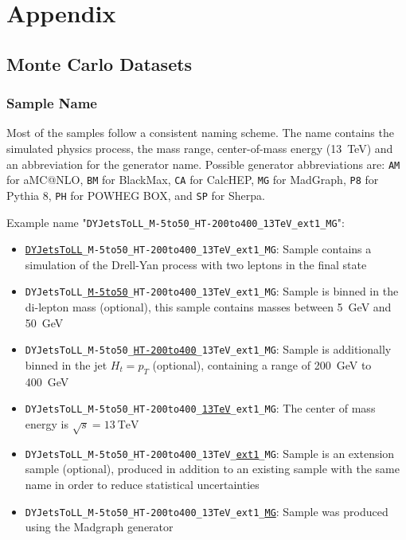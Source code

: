 

\renewcommand\thechapter{A}
\chapter{Appendix}

\section{Monte Carlo Datasets}
\label{app:mc_datasets}

\subsection{Sample Name}
Most of the samples follow a consistent naming scheme. The name contains the simulated physics process, the mass range, center-of-mass energy (\SI{13}{\TeV}) and an abbreviation for the generator name.
Possible generator abbreviations are: \texttt{AM} for aMC@NLO, \texttt{BM} for BlackMax, \texttt{CA} for CalcHEP, \texttt{MG} for MadGraph, \texttt{P8} for Pythia 8, \texttt{PH} for POWHEG BOX, and \texttt{SP} for Sherpa.

Example name "\texttt{DYJetsToLL\_M-5to50\_HT-200to400\_13TeV\_ext1\_MG}":
\begin{itemize}
\item \texttt{\underline{DYJetsToLL}\_M-5to50\_HT-200to400\_13TeV\_ext1\_MG}: Sample contains a simulation of the Drell-Yan process with two leptons in the final state
\item \texttt{DYJetsToLL\_\underline{M-5to50}\_HT-200to400\_13TeV\_ext1\_MG}: Sample is binned in the di-lepton mass (optional), this sample contains masses between \SI{5}{\GeV} and \SI{50}{\GeV}
\item \texttt{DYJetsToLL\_M-5to50\_\underline{HT-200to400}\_13TeV\_ext1\_MG}: Sample is additionally binned in the jet $H_t = p_T$ (optional), containing a range of \SI{200}{\GeV} to \SI{400}{\GeV}
\item \texttt{DYJetsToLL\_M-5to50\_HT-200to400\_\underline{13TeV}\_ext1\_MG}: The center of mass energy is $\sqrt{s} = \SI{13}{\TeV}$
\item \texttt{DYJetsToLL\_M-5to50\_HT-200to400\_13TeV\_\underline{ext1}\_MG}:
 Sample is an extension sample (optional), produced in addition to an existing sample with the same name in order to reduce statistical uncertainties
\item \texttt{DYJetsToLL\_M-5to50\_HT-200to400\_13TeV\_ext1\_\underline{MG}}:
 Sample was produced using the Madgraph generator
\end{itemize}

